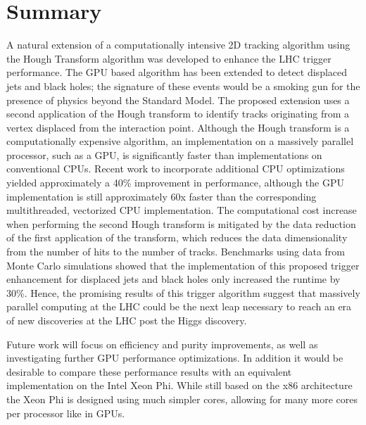 \documentclass[preprint,sort&compress]{elsarticle}
\begin{document}
\section{Summary}

A natural extension of a computationally intensive 2D tracking algorithm using the Hough Transform algorithm was developed to enhance the LHC trigger performance.
The GPU based algorithm has been extended to detect displaced jets and black holes; the signature of these events would be a smoking gun for the presence of physics beyond the Standard Model.  The proposed extension uses 
a second application of the Hough transform to identify tracks originating from a vertex displaced from the interaction point.  Although the Hough transform is a 
computationally expensive algorithm, an implementation on a massively parallel processor, such as a GPU, is significantly faster than implementations on conventional CPUs.  Recent work to incorporate additional CPU optimizations yielded approximately a 40\% improvement in performance, although the GPU implementation is still approximately 60x faster 
than the corresponding multithreaded, vectorized CPU implementation.  The computational cost increase when performing the second Hough transform is mitigated by the data reduction of the first application of the transform, which reduces the data dimensionality from the number of hits to the number of tracks.  Benchmarks using data from Monte Carlo simulations showed that the implementation of this proposed trigger enhancement for displaced jets and black holes only increased the runtime by 30\%. Hence, the promising results of this trigger algorithm suggest that massively parallel computing at the LHC could be the next leap necessary 
to reach an era of new discoveries at the LHC post the Higgs discovery. 

Future work will focus on efficiency and purity improvements, as well as investigating further GPU performance optimizations.  In addition it would be desirable to compare these performance results with an equivalent implementation on the Intel Xeon Phi.  While still based on the x86 architecture the Xeon Phi is designed using much simpler cores, allowing for many more cores per processor like in GPUs.



\end{document}

